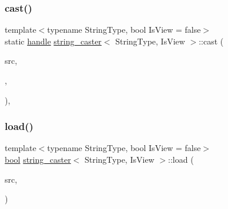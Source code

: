 \subsubsection{\texorpdfstring{cast()}{cast()}}
{\footnotesize\ttfamily template$<$typename String\+Type, bool Is\+View = false$>$ \\
static \mbox{\hyperlink{classhandle}{handle}} \mbox{\hyperlink{structstring__caster}{string\+\_\+caster}}$<$ String\+Type, Is\+View $>$\+::cast (\begin{DoxyParamCaption}\item[{const String\+Type \&}]{src,  }\item[{\mbox{\hyperlink{detail_2common_8h_adde72ab1fb0dd4b48a5232c349a53841}{return\+\_\+value\+\_\+policy}}}]{,  }\item[{\mbox{\hyperlink{classhandle}{handle}}}]{ }\end{DoxyParamCaption})\hspace{0.3cm}{\ttfamily [inline]}, {\ttfamily [static]}}

\mbox{\label{structstring__caster_aa38bc121001de95bcf9c45ddbffdb635}} 
\subsubsection{\texorpdfstring{load()}{load()}}
{\footnotesize\ttfamily template$<$typename String\+Type, bool Is\+View = false$>$ \\
\mbox{\hyperlink{asdl_8h_af6a258d8f3ee5206d682d799316314b1}{bool}} \mbox{\hyperlink{structstring__caster}{string\+\_\+caster}}$<$ String\+Type, Is\+View $>$\+::load (\begin{DoxyParamCaption}\item[{\mbox{\hyperlink{classhandle}{handle}}}]{src,  }\item[{\mbox{\hyperlink{asdl_8h_af6a258d8f3ee5206d682d799316314b1}{bool}}}]{ }\end{DoxyParamCaption})\hspace{0.3cm}{\ttfamily [inline]}}

\mbox{\label{structstring__caster_afe8c27c979388d23f805bb38f04d94ab}} 
